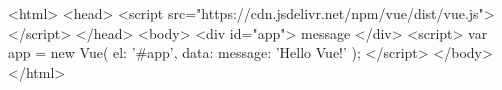 <html>
    <head>
        <script src="https://cdn.jsdelivr.net/npm/vue/dist/vue.js"></script>
    </head>
    <body>
        <div id="app">
            {{ message }}
        </div>
        <script>
        var app = new Vue({ 
        el: '#app',
        data: {
            message: 'Hello Vue!'
        }
    });
</script>
    </body>
</html>